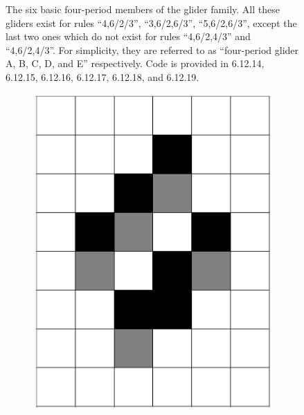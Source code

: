 \documentclass[12pt]{article}
\numberwithin{figure}{section} %
\begin{document}
\begin{figure}[H]
   \caption{The six basic four-period members of the glider family. All these gliders exist for rules “4,6/2/3”, “3,6/2,6/3”, “5,6/2,6/3”, except the last two ones which do not exist for rules “4,6/2,4/3” and “4,6/2,4/3”. For simplicity, they are referred to as “four-period glider A, B, C, D, and E” respectively. Code is provided in 6.12.14, 6.12.15, 6.12.16, 6.12.17, 6.12.18, and 6.12.19. }
   \label{fig:four-period gliders}
   \vspace{-1.5em}
\end{figure}

\begin{figure}[H]
  \begin{subfigure}{0.19\textwidth}
     \centering
     \includegraphics[width=\linewidth]{Section4/21.0}
     \subcaption{}
   \end{subfigure}
     \begin{subfigure}{0.19\textwidth}
     \centering

\end{subfigure}
\end{figure}
\end{document}
